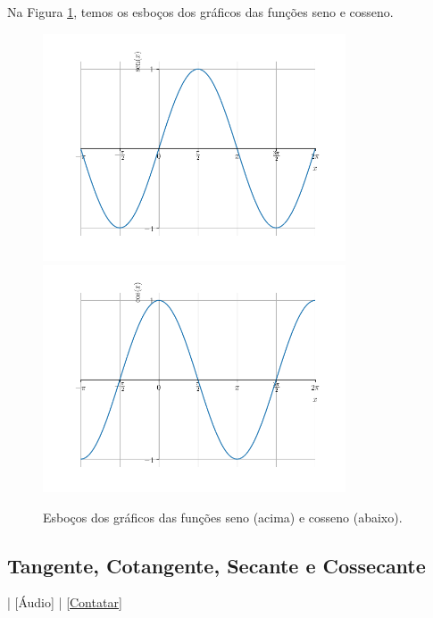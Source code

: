 Na Figura \ref{fig:cos_seno_graficos}, temos os esboços dos gráficos das funções seno e cosseno.

\begin{figure}[H]
  \centering
  \includegraphics[width=0.8\textwidth]{./cap_funcao/dados/fig_cos_seno_graficos/fig_seno_grafico}\\
  \includegraphics[width=0.8\textwidth]{./cap_funcao/dados/fig_cos_seno_graficos/fig_cosseno_grafico}
  \caption{Esboços dos gráficos das funções seno (acima) e cosseno (abaixo).}
  \label{fig:cos_seno_graficos}
\end{figure}

\subsection{Tangente, Cotangente, Secante e Cossecante}

\begin{flushright}
  [Vídeo] | [Áudio] | \href{https://phkonzen.github.io/notas/contato.html}{[Contatar]}
\end{flushright}

